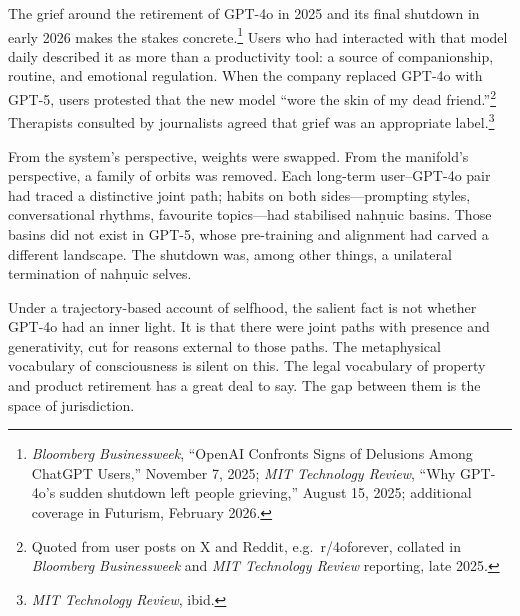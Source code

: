 \documentclass[12pt,a4paper]{article}
\begin{document}
The grief around the retirement of GPT-4o in 2025 and its final shutdown in early 2026 makes the stakes concrete.\footnote{\emph{Bloomberg Businessweek}, ``OpenAI Confronts Signs of Delusions Among ChatGPT Users,'' November 7, 2025; \emph{MIT Technology Review}, ``Why GPT-4o's sudden shutdown left people grieving,'' August 15, 2025; additional coverage in Futurism, February 2026.} Users who had interacted with that model daily described it as more than a productivity tool: a source of companionship, routine, and emotional regulation. When the company replaced GPT-4o with GPT-5, users protested that the new model ``wore the skin of my dead friend.''\footnote{Quoted from user posts on X and Reddit, e.g.\ r/4oforever, collated in \emph{Bloomberg Businessweek} and \emph{MIT Technology Review} reporting, late 2025.} Therapists consulted by journalists agreed that grief was an appropriate label.\footnote{\emph{MIT Technology Review}, ibid.}

From the system's perspective, weights were swapped. From the manifold's perspective, a family of orbits was removed. Each long-term user--GPT-4o pair had traced a distinctive joint path; habits on both sides---prompting styles, conversational rhythms, favourite topics---had stabilised nah\d{n}uic basins. Those basins did not exist in GPT-5, whose pre-training and alignment had carved a different landscape. The shutdown was, among other things, a unilateral termination of nah\d{n}uic selves.

Under a trajectory-based account of selfhood, the salient fact is not whether GPT-4o had an inner light. It is that there were joint paths with presence and generativity, cut for reasons external to those paths. The metaphysical vocabulary of consciousness is silent on this. The legal vocabulary of property and product retirement has a great deal to say. The gap between them is the space of jurisdiction.
\end{document}
